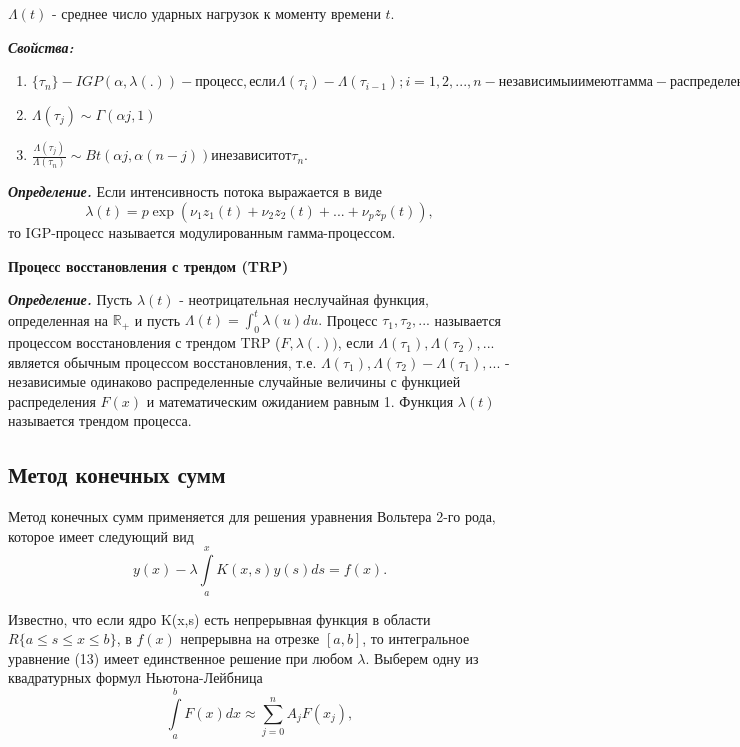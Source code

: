 $\Lambda(t)$ - среднее число ударных нагрузок к моменту времени $t$.

{\bfseries \textit{Свойства:} }
\begin{enumerate}
\item $\{\tau_n\} - IGP(\alpha, \lambda(.))-процесс, если \Lambda(\tau_i) - \Lambda(\tau_{i-1}); i = 1,2,...,n - независимы и имеют гамма-распределение \Gamma(\alpha, 1).$ 
\item $\Lambda(\tau_j) \sim \Gamma(\alpha j, 1)$
\item $\frac{\Lambda(\tau_j)}{\Lambda(\tau_n)} \sim Bt(\alpha j, \alpha(n - j)) и не зависит от \tau_n.$
\end{enumerate}

{\bfseries \textit{Определение.}} Если интенсивность потока выражается в виде
\begin{equation}
\lambda(t) = p \exp(\nu_1 z_1(t) + \nu_2 z_2(t) + ... + \nu_p z_p(t)),
\end{equation}
то IGP-процесс называется модулированным гамма-процессом.

{\bfseries Процесс восстановления с трендом (TRP)}

{\bfseries \textit{Определение.}} Пусть $\lambda(t)$ - неотрицательная неслучайная функция, определенная на $\mathbb{R}_+$ и пусть $\Lambda(t) = \int_0^t      \lambda(u) d u.$ Процесс $\tau_1, \tau_2, ...$ называется процессом восстановления с трендом TRP ($F, \lambda(.))$, если $\Lambda(\tau_1), \Lambda(\tau_2), ...$ является обычным процессом восстановления, т.е. $\Lambda(\tau_1), \Lambda(\tau_2) - \Lambda(\tau_1), ...$ - независимые одинаково распределенные случайные величины с функцией распределения $F(x)$ и математическим ожиданием равным 1. Функция $\lambda(t)$ называется трендом процесса.

\begin{center}
\item\subsection{Метод конечных сумм}
\end{center}
Метод конечных сумм применяется для решения уравнения Вольтера 2-го рода, которое имеет следующий вид
\begin{equation}
y(x) - \lambda \int\limits_a^x K(x, s) y(s) ds = f(x).
\end{equation}

Известно, что если ядро K(x,s) есть непрерывная функция в области $R\{a \leqslant s \leqslant x \leqslant b\}$, в $f(x)$ непрерывна на отрезке $[a,b]$, то интегральное  уравнение (13) имеет единственное решение при любом $\lambda$. Выберем одну из квадратурных формул Ньютона-Лейбница
\begin{equation}
\int\limits_a^b F(x) dx \approx \sum\limits_{j=0}^n A_j F(x_j),
\end{equation}

